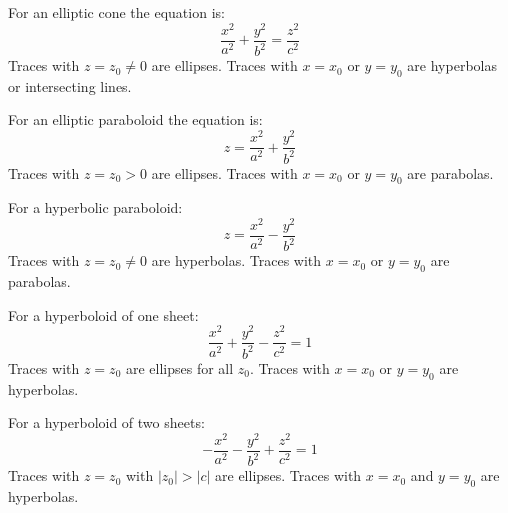 \documentclass[../calc3.tex]{subfiles}
\begin{document}
For an elliptic cone the equation is:
\[\frac{x^2}{a^2}+\frac{y^2}{b^2}=\frac{z^2}{c^2}\]
Traces with $z = z_0 \neq 0$ are ellipses. Traces with $x=x_0$ or $y=y_0$ are hyperbolas or intersecting lines.

For an elliptic paraboloid the equation is:
\[z=\frac{x^2}{a^2}+\frac{y^2}{b^2}\]
Traces with $z=z_0>0$ are ellipses. Traces with $x=x_0$ or $y=y_0$ are parabolas.

For a hyperbolic paraboloid:
\[z=\frac{x^2}{a^2}-\frac{y^2}{b^2}\]
Traces with $z=z_0\neq 0$ are hyperbolas. Traces with $x=x_0$ or $y=y_0$ are parabolas.

For a hyperboloid of one sheet:
\[\frac{x^2}{a^2}+\frac{y^2}{b^2}-\frac{z^2}{c^2}=1\]
Traces with $z=z_0$ are ellipses for all $z_0$. Traces with $x=x_0$ or $y=y_0$ are hyperbolas.

For a hyperboloid of two sheets:
\[-\frac{x^2}{a^2}-\frac{y^2}{b^2}+\frac{z^2}{c^2}=1\]
Traces with $z=z_0$ with $|z_0|>|c|$ are ellipses. Traces with $x=x_0$ and $y=y_0$ are hyperbolas.
\end{document}
